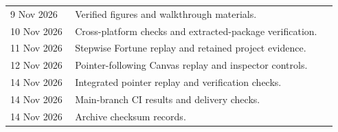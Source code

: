 \begin{longtable}{@{}p{0.19\linewidth}p{0.77\linewidth}@{}}
9 Nov 2026 & Verified figures and walkthrough materials. \\
10 Nov 2026 & Cross-platform checks and extracted-package verification. \\
11 Nov 2026 & Stepwise Fortune replay and retained project evidence. \\
12 Nov 2026 & Pointer-following Canvas replay and inspector controls. \\
14 Nov 2026 & Integrated pointer replay and verification checks. \\
14 Nov 2026 & Main-branch CI results and delivery checks. \\
14 Nov 2026 & Archive checksum records. \\
\end{longtable}
\endgroup
